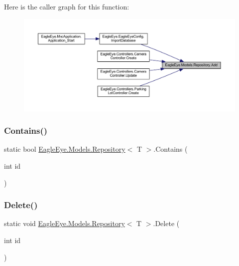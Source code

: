 Here is the caller graph for this function\+:\nopagebreak
\begin{figure}[H]
\begin{center}
\leavevmode
\includegraphics[width=350pt]{class_eagle_eye_1_1_models_1_1_repository_aca9fded0480d870f0ec7837700243a2b_icgraph}
\end{center}
\end{figure}
\mbox{\label{class_eagle_eye_1_1_models_1_1_repository_ad94aecd681043ac78cd50dcde4aaeb0d}} 
\subsubsection{\texorpdfstring{Contains()}{Contains()}}
{\footnotesize\ttfamily static bool \mbox{\hyperlink{class_eagle_eye_1_1_models_1_1_repository}{Eagle\+Eye.\+Models.\+Repository}}$<$ T $>$.Contains (\begin{DoxyParamCaption}\item[{int}]{id }\end{DoxyParamCaption})\hspace{0.3cm}{\ttfamily [static]}}





\mbox{\label{class_eagle_eye_1_1_models_1_1_repository_ad50f201c8f5f1c7794ddf068ed459854}} 
\subsubsection{\texorpdfstring{Delete()}{Delete()}}
{\footnotesize\ttfamily static void \mbox{\hyperlink{class_eagle_eye_1_1_models_1_1_repository}{Eagle\+Eye.\+Models.\+Repository}}$<$ T $>$.Delete (\begin{DoxyParamCaption}\item[{int}]{id }\end{DoxyParamCaption})\hspace{0.3cm}{\ttfamily [static]}}





